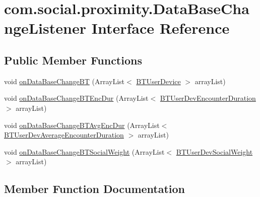 \hypertarget{interfacecom_1_1social_1_1proximity_1_1_data_base_change_listener}{}\section{com.\+social.\+proximity.\+Data\+Base\+Change\+Listener Interface Reference}
\label{interfacecom_1_1social_1_1proximity_1_1_data_base_change_listener}
\subsection*{Public Member Functions}
\begin{DoxyCompactItemize}
\item 
void \hyperlink{interfacecom_1_1social_1_1proximity_1_1_data_base_change_listener_ac8064dca0d90e804d6943c51a4464b2e}{on\+Data\+Base\+Change\+B\+T} (Array\+List$<$ \hyperlink{classcom_1_1social_1_1proximity_1_1_b_t_user_device}{B\+T\+User\+Device} $>$ array\+List)
\item 
void \hyperlink{interfacecom_1_1social_1_1proximity_1_1_data_base_change_listener_ae0bb6bcc342acb5d16c605ba959ad23c}{on\+Data\+Base\+Change\+B\+T\+Enc\+Dur} (Array\+List$<$ \hyperlink{classcom_1_1social_1_1proximity_1_1_b_t_user_dev_encounter_duration}{B\+T\+User\+Dev\+Encounter\+Duration} $>$ array\+List)
\item 
void \hyperlink{interfacecom_1_1social_1_1proximity_1_1_data_base_change_listener_a2a071c7aabce3cdbc1b1f5d0c5e0fb24}{on\+Data\+Base\+Change\+B\+T\+Avg\+Enc\+Dur} (Array\+List$<$ \hyperlink{classcom_1_1social_1_1proximity_1_1_b_t_user_dev_average_encounter_duration}{B\+T\+User\+Dev\+Average\+Encounter\+Duration} $>$ array\+List)
\item 
void \hyperlink{interfacecom_1_1social_1_1proximity_1_1_data_base_change_listener_abd4716358cbfbd0ba1cef920ae5a4bf1}{on\+Data\+Base\+Change\+B\+T\+Social\+Weight} (Array\+List$<$ \hyperlink{classcom_1_1social_1_1proximity_1_1_b_t_user_dev_social_weight}{B\+T\+User\+Dev\+Social\+Weight} $>$ array\+List)
\end{DoxyCompactItemize}


\subsection{Member Function Documentation}
\hypertarget{interfacecom_1_1social_1_1proximity_1_1_data_base_change_listener_ac8064dca0d90e804d6943c51a4464b2e}{}
